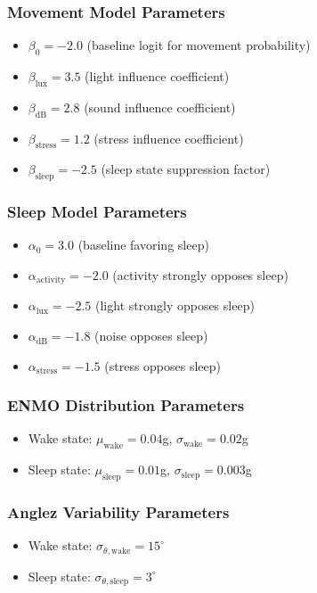 \documentclass[conference]{IEEEtran}
\begin{document}
\subsubsection{Movement Model Parameters}
\begin{itemize}
	\item $\beta_0 = -2.0$ (baseline logit for movement probability)
	\item $\beta_{\text{lux}} = 3.5$ (light influence coefficient)
	\item $\beta_{\text{dB}} = 2.8$ (sound influence coefficient)
	\item $\beta_{\text{stress}} = 1.2$ (stress influence coefficient)
	\item $\beta_{\text{sleep}} = -2.5$ (sleep state suppression factor)
\end{itemize}

\subsubsection{Sleep Model Parameters}
\begin{itemize}
	\item $\alpha_0 = 3.0$ (baseline favoring sleep)
	\item $\alpha_{\text{activity}} = -2.0$ (activity strongly opposes sleep)
	\item $\alpha_{\text{lux}} = -2.5$ (light strongly opposes sleep)
	\item $\alpha_{\text{dB}} = -1.8$ (noise opposes sleep)
	\item $\alpha_{\text{stress}} = -1.5$ (stress opposes sleep)
\end{itemize}

\subsubsection{ENMO Distribution Parameters}
\begin{itemize}
	\item Wake state: $\mu_{\text{wake}} = 0.04$g, $\sigma_{\text{wake}} = 0.02$g
	\item Sleep state: $\mu_{\text{sleep}} = 0.01$g, $\sigma_{\text{sleep}} = 0.003$g
\end{itemize}

\subsubsection{Anglez Variability Parameters}
\begin{itemize}
	\item Wake state: $\sigma_{\theta,\text{wake}} = 15^\circ$
	\item Sleep state: $\sigma_{\theta,\text{sleep}} = 3^\circ$
\end{itemize}
\end{document}
